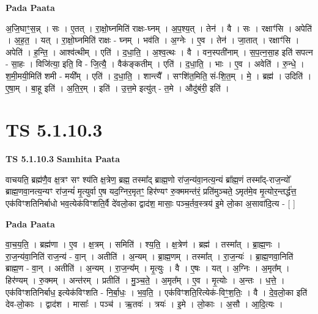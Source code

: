 \documentclass[17pt]{extarticle}
\begin{document}
\textbf{Pada Paata} \newline

अ॒जि॒घाꣳ॒॒स॒न्न् । सः । ए॒तत् । रा॒क्षो॒घ्नमिति॑ राक्षः-घ्नम् । अ॒प॒श्य॒त् । तेन॑ । वै । सः । रक्षाꣳ॑सि । अपेति॑ । अ॒ह॒त॒ । यत् । रा॒क्षो॒घ्नमिति॑ राक्षः - घ्नम् । भव॑ति । अ॒ग्नेः । ए॒व । तेन॑ । जा॒तात् । रक्षाꣳ॑सि । अपेति॑ । ह॒न्ति॒ । आश्व॑त्थीम् । एति॑ । द॒धा॒ति॒ । अ॒श्व॒त्थः । वै । वन॒स्पती॑नाम् । स॒प॒त्न॒सा॒ह इति॑ सपत्न - सा॒हः । विजि॑त्या॒ इति॒ वि - जि॒त्यै॒ । वैक॑ङ्कतीम् । एति॑ । द॒धा॒ति॒ । भाः । ए॒व । अवेति॑ । रु॒न्धे॒ । श॒मी॒मयी॒मिति॑ शमी - मयी᳚म् । एति॑ । द॒धा॒ति॒ । शान्त्यै᳚ । सꣳशि॑त॒मिति॒ सं-शि॒त॒म् । मे॒ । ब्रह्म॑ । उदिति॑ । ए॒षा॒म् । बा॒हू इति॑ । अ॒ति॒र॒म् । इति॑ । उ॒त्त॒मे इत्यु॑त् - त॒मे । औदु॑बंरी॒ इति॑ ।  \newline





\section{ TS 5.1.10.3 }

\textbf{TS 5.1.10.3 } \newline
\textbf{Samhita Paata} \newline

वाचयति॒ ब्रह्म॑णै॒व क्ष॒त्रꣳ सꣳ श्य॑ति क्ष॒त्रेण॒ ब्रह्म॒ तस्मा᳚द् ब्राह्म॒णो रा॑ज॒न्य॑वा॒नत्य॒न्यं ब्रा᳚ह्म॒णं तस्मा᳚द्-राज॒न्यो᳚ ब्राह्म॒णवा॒नत्य॒न्यꣳ रा॑ज॒न्यं॑ मृ॒त्युर्वा ए॒ष यद॒ग्निर॒मृतꣳ॒॒ हिर॑ण्यꣳ रु॒क्ममन्त॑रं॒ प्रति॑मुञ्चते॒ ऽमृत॑मे॒व मृ॒त्योर॒न्तर्द्ध॑त्त॒ एक॑विꣳशतिनिर्बाधो भव॒त्येक॑विꣳशति॒र्वै दे॑वलो॒का द्वाद॑श॒ मासाः॒ पञ्च॒र्तव॒स्त्रय॑ इ॒मे लो॒का अ॒सावा॑दि॒त्य - [  ] \newline

\textbf{Pada Paata} \newline

वा॒च॒य॒ति॒ । ब्रह्म॑णा । ए॒व । क्ष॒त्रम् । समिति॑ । श्य॒ति॒ । क्ष॒त्रेण॑ । ब्रह्म॑ । तस्मा᳚त् । ब्रा॒ह्म॒णः । रा॒ज॒न्य॑वा॒निति॑ राज॒न्य॑ - वा॒न् । अतीति॑ । अ॒न्यम् । ब्रा॒ह्म॒णम् । तस्मा᳚त् । रा॒ज॒न्यः॑ । ब्रा॒ह्म॒णवा॒निति॑ ब्राह्म॒ण - वा॒न् । अतीति॑ । अ॒न्यम् । रा॒ज॒न्य᳚म् । मृ॒त्युः । वै । ए॒षः । यत् । अ॒ग्निः । अ॒मृत᳚म् । हिर॑ण्यम् । रु॒क्मम् । अन्त॑रम् । प्रतीति॑ । मु॒ञ्च॒ते॒ । अ॒मृत᳚म् । ए॒व । मृ॒त्योः । अ॒न्तः । ध॒त्ते॒ । एक॑विꣳशतिनिर्बाध॒ इत्येक॑विꣳशति - नि॒र्बा॒धः॒ । भ॒व॒ति॒ । एक॑विꣳशति॒रित्येक॑-विꣳ॒॒श॒तिः॒ । वै । दे॒व॒लो॒का इति॑ देव-लो॒काः । द्वाद॑श । मासाः᳚ । पञ्च॑ । ऋ॒तवः॑ । त्रयः॑ । इ॒मे । लो॒काः । अ॒सौ । आ॒दि॒त्यः ।  \newline
\end{document}
